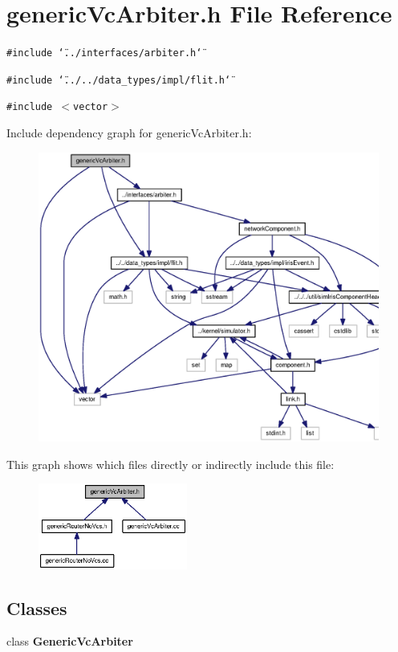 \section{genericVcArbiter.h File Reference}
\label{genericVcArbiter_8h}
{\tt \#include \char`\"{}../interfaces/arbiter.h\char`\"{}}\par
{\tt \#include \char`\"{}../../data\_\-types/impl/flit.h\char`\"{}}\par
{\tt \#include $<$vector$>$}\par


Include dependency graph for genericVcArbiter.h:\nopagebreak
\begin{figure}[H]
\begin{center}
\leavevmode
\includegraphics[width=326pt]{genericVcArbiter_8h__incl}
\end{center}
\end{figure}


This graph shows which files directly or indirectly include this file:\nopagebreak
\begin{figure}[H]
\begin{center}
\leavevmode
\includegraphics[width=139pt]{genericVcArbiter_8h__dep__incl}
\end{center}
\end{figure}
\subsection*{Classes}
\begin{CompactItemize}
\item 
class {\bf GenericVcArbiter}
\end{CompactItemize}
